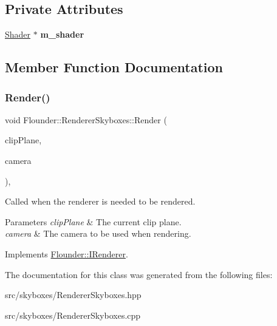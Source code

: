 \subsection*{Private Attributes}
\begin{DoxyCompactItemize}
\item 
\mbox{\label{class_flounder_1_1_renderer_skyboxes_af4f397d25ecdd4e66893e42fc1f3c8b4}} 
\hyperlink{class_flounder_1_1_shader}{Shader} $\ast$ {\bfseries m\+\_\+shader}
\end{DoxyCompactItemize}


\subsection{Member Function Documentation}
\mbox{\label{class_flounder_1_1_renderer_skyboxes_a27115faed1ab81350a8f718203f3c4bd}} 
\subsubsection{\texorpdfstring{Render()}{Render()}}
{\footnotesize\ttfamily void Flounder\+::\+Renderer\+Skyboxes\+::\+Render (\begin{DoxyParamCaption}\item[{const \hyperlink{class_flounder_1_1_vector4}{Vector4} \&}]{clip\+Plane,  }\item[{const \hyperlink{class_flounder_1_1_i_camera}{I\+Camera} \&}]{camera }\end{DoxyParamCaption})\hspace{0.3cm}{\ttfamily [override]}, {\ttfamily [virtual]}}



Called when the renderer is needed to be rendered. 


\begin{DoxyParams}{Parameters}
{\em clip\+Plane} & The current clip plane. \\
\hline
{\em camera} & The camera to be used when rendering. \\
\hline
\end{DoxyParams}


Implements \hyperlink{class_flounder_1_1_i_renderer_a4e86d6621f6f63442e1c07655afd9daa}{Flounder\+::\+I\+Renderer}.



The documentation for this class was generated from the following files\+:\begin{DoxyCompactItemize}
\item 
src/skyboxes/Renderer\+Skyboxes.\+hpp\item 
src/skyboxes/Renderer\+Skyboxes.\+cpp\end{DoxyCompactItemize}
